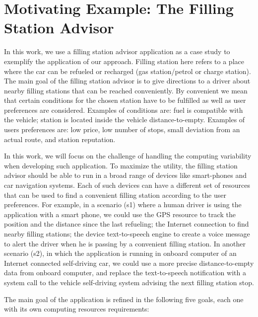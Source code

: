 \section{Motivating Example: The Filling Station Advisor}
\label{sec:case_study}

In this work, we use a filling station advisor application as a case study to exemplify the application of our approach.
Filling station here refers to a place where the car can be refueled or recharged (gas station/petrol or charge station). The main goal of the filling station advisor is to give directions to a driver about nearby filling stations that can be reached conveniently. By convenient we mean that certain conditions for the chosen station have to be fulfilled as well as user preferences are considered. Examples of conditions are: fuel is compatible with the vehicle; station is located inside the vehicle distance-to-empty. Examples of users preferences are: low price, low number of stops, small deviation from an actual route, and station reputation.

In this work, we will focus on the challenge of handling the computing variability when developing such application. To maximize the utility, the filling station advisor should be able to run in a broad range of devices like smart-phones and car navigation systems. Each of such devices can have a different set of resources that can be used to find a convenient filling station according to the user preferences. For example, in a scenario (s1) where a human driver is using the application with a smart phone, we could use the GPS resource to track the position and the distance since the last refueling; the Internet connection to find nearby filling stations; the device text-to-speech engine to create a voice message to alert the driver when he is passing by a convenient filling station. In another scenario (s2), in which the application is running in onboard computer of an Internet connected self-driving car, we could use a more precise distance-to-empty data from onboard computer, and replace the text-to-speech notification with a system call to the vehicle self-driving system advising the next filling station stop.

The main goal of the application is refined in the following five goals, each one with its own computing resources requirements:

